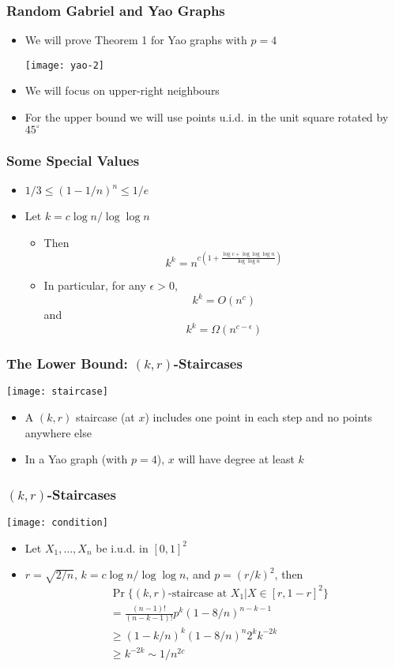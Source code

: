 \documentclass{beamer}
\begin{document}
\frame
{
  \frametitle{Random Gabriel and Yao Graphs}
  \begin{itemize}
    \item We will prove Theorem 1 for Yao graphs with $p=4$
    \begin{center}
      \texttt{[image: yao-2]}
    \end{center}
    \item We will focus on upper-right neighbours
    \item For the upper bound we will use points u.i.d. in the unit 
          square rotated by $45^\circ$
  \end{itemize}
}


\frame
{
  \frametitle{Some Special Values}
  \begin{itemize}
    \item $1/3 \le (1-1/n)^n \le 1/e$
    \item Let $k=c\log n / \log\log n$
      \begin{itemize}
        \item Then
         \[ k^k = n^{c(1 + \frac{\log c+\log\log\log n}{\log\log n})} \]
        \item In particular, for any $\epsilon > 0$,
         \[ k^k = O(n^c) \]
         and 
         \[ k^k = \Omega(n^{c-\epsilon}) \]
      \end{itemize}
  \end{itemize}
}

\frame
{
  \frametitle{The Lower Bound: $(k,r)$-Staircases}

  \begin{center}
    \texttt{[image: staircase]}
  \end{center}
  \begin{itemize}
    \item A $(k,r)$ staircase (at $x$) includes one point in each step
          and no points anywhere else
    \item In a Yao graph (with $p=4$), $x$ will have degree at least $k$
  \end{itemize}
}


\frame
{
  \frametitle{$(k,r)$-Staircases}

  \begin{center}
      \texttt{[image: condition]} 
  \end{center}
  \begin{itemize}
    \item Let $X_1,\ldots,X_n$ be i.u.d. in $[0,1]^2$
    \item $r=\sqrt{2/n}$, $k=c\log n/\log\log n$, and $p=(r/k)^2$, then
    \[\begin{aligned}
      & \Pr\{\mbox{$(k,r)$-staircase at $X_1$}| X\in[r,1-r]^2\}  \\
       &  = \frac{(n-1)!}{(n-k-1)!} p^k (1-8/n)^{n-k-1} \\
       &  \ge (1-k/n)^k (1-8/n)^{n} 2^k k^{-2k} \\
       &  \ge k^{-2k} \sim 1/n^{2c}
      \end{aligned}
    \]
  \end{itemize}
}
\end{document}
